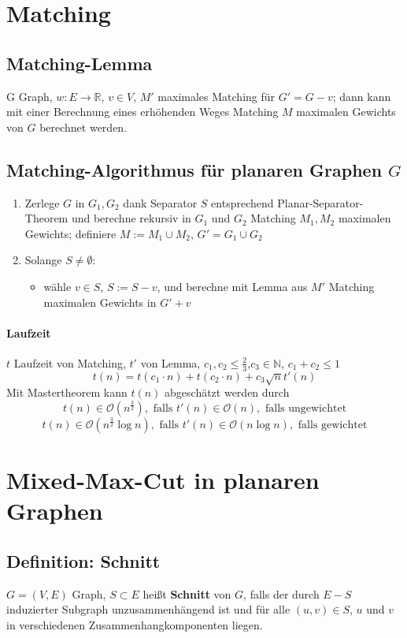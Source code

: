\documentclass{article}
\newcommand{\df}[1]{\textbf{#1}\index{#1}}
\newcommand{\N}{\mathbb{N}}
\renewcommand{\O}[1]{\mathcal{O}\left(#1\right)}
\newcommand{\R}{\mathbb{R}}
\begin{document}
\section{Matching}


\subsection{Matching-Lemma}
G Graph, $w : E \rightarrow \R$, $v\in V$, $M'$ maximales Matching für $G' = G -v$; dann kann mit einer Berechnung eines erhöhenden Weges Matching $M$ maximalen Gewichts von $G$ berechnet werden.

\subsection{Matching-Algorithmus für planaren Graphen $G$}
\begin{enumerate}
	\item Zerlege $G$ in $G_1, G_2$ dank Separator $S$ entsprechend Planar-Separator-Theorem und berechne rekursiv in $G_1$ und $G_2$ Matching $M_1, M_2$ maximalen Gewichts; definiere $M:= M_1\cup M_2$, $G' = G_1\cup G_2$
	\item Solange $S \neq \emptyset$:
	\begin{itemize}
		\item wähle $v\in S$, $S:= S-v$, und berechne mit Lemma aus $M'$ Matching maximalen Gewichts in $G'+v$
	\end{itemize}
\end{enumerate}

\paragraph{Laufzeit}
$t$ Laufzeit von Matching, $t'$ von Lemma, $c_1,c_2 \leq \frac{2}{3}$,$c_3\in \N$, $c_1+c_2 \leq 1$
\[t(n) = t(c_1\cdot n )+t(c_2\cdot n ) + c_3\sqrt{n}t'(n)\]
Mit Mastertheorem kann $t(n)$ abgeschätzt werden durch
\[t(n) \in \O{n^\frac{3}{2}}, \text{ falls }t'(n) \in \O{n}, \text{ falls ungewichtet}\]
\[t(n) \in \O{n^\frac{3}{2}\log n}, \text{ falls }t'(n) \in \O{n\log n}, \text{ falls gewichtet}\]

\newpage
\section{Mixed-Max-Cut in planaren Graphen}

\subsection{Definition: Schnitt}
$G = (V,E)$ Graph, $S \subset E$ heißt \df{Schnitt} von $G$, falls der durch $E-S$ induzierter Subgraph unzusammenhängend ist und für alle $(u,v) \in S$, $u$ und $v$ in verschiedenen Zusammenhangkomponenten liegen.
\end{document}
